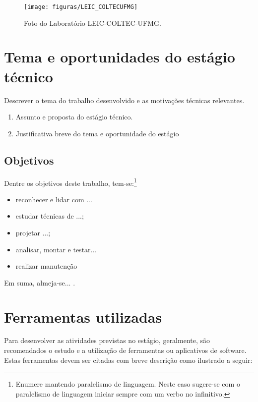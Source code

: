 \begin{figure} [h!]
	\centering
	\texttt{[image: figuras/LEIC\_COLTECUFMG]}
	\caption{Foto do Laboratório LEIC-COLTEC-UFMG.}
	\label{fig:LEICCOLTECUFMG}
\end{figure}


\section{Tema e oportunidades do estágio técnico}

Descrever o  tema do trabalho desenvolvido e as motivações técnicas relevantes.
\begin{enumerate}[noitemsep] %
	\item Assunto e proposta do estágio técnico.
	\item Justificativa breve do tema e oportunidade do estágio
\end{enumerate}

\subsection{Objetivos}
Dentre os objetivos deste trabalho, tem-se:\footnote{Enumere mantendo paralelismo de linguagem.   Neste caso sugere-se com o paralelismo de linguagem iniciar sempre com um verbo no infinitivo.}
\begin{itemize}[noitemsep]
	\item reconhecer e lidar com ...
	\item estudar  técnicas de ...;
	\item projetar ...;
	\item analisar, montar e testar...
	\item realizar manutenção
	
\end{itemize}
Em suma, almeja-se... .

\section{Ferramentas  utilizadas}
Para desenvolver as atividades previstas no estágio, geralmente, são recomendados o estudo e a utilização de ferramentas ou aplicativos de software. Estas ferramentas  devem ser citadas com breve descrição como ilustrado a seguir:

